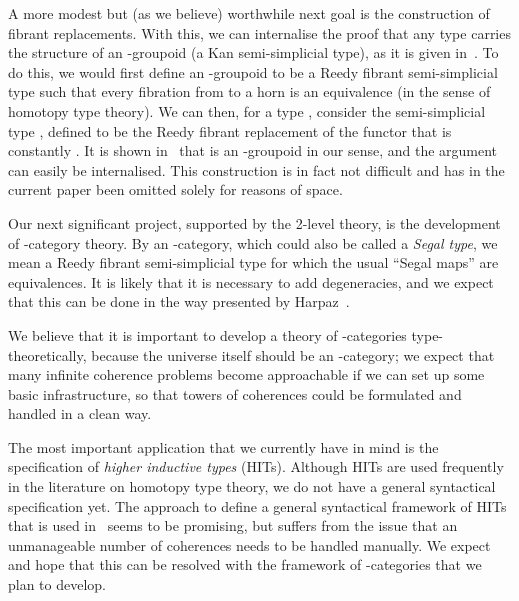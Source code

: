 \documentclass[a4paper,reqno]{amsart}
\theoremstyle{plain}
\theoremstyle{definition}
\begin{document}
A more modest but (as we believe) worthwhile next goal is the construction of fibrant replacements.
With this, we can internalise the proof that any type carries the structure of an -groupoid (a Kan semi-simplicial type), as it is given in~\cite[Remark and Corollary 16]{kraus_generaluniversalproperty}.
To do this, we would first define an -groupoid to be a Reedy fibrant semi-simplicial type  such that every fibration from  to a horn is an equivalence (in the sense of homotopy type theory).
We can then, for a type , consider the semi-simplicial type , defined to be the Reedy fibrant replacement of the functor that is constantly .
It is shown in~\cite{kraus_generaluniversalproperty} that  is an -groupoid in our sense, and the argument can easily be internalised. 
This construction is in fact not difficult and has in the current paper been omitted solely for reasons of space.

Our next significant project, supported by the 2-level theory, 
is the development of -category theory.
By an -category, which could also be called a \emph{Segal type}, we mean a Reedy fibrant semi-simplicial type  for which the usual ``Segal maps''  are equivalences.
It is likely that it is necessary to add degeneracies, and we expect that this can be done in the way presented by Harpaz~\cite{harpaz2015quasi}.

We believe that it is important to develop a theory of -categories
type-theoretically, because the universe itself should be an
-category; we expect that many infinite coherence problems become
approachable if we can set up some basic infrastructure, so that towers of
coherences could be formulated and handled in a clean way.

The most important application that we currently have in mind is the specification of \emph{higher inductive types} (HITs).
Although HITs are used frequently in the literature on homotopy type theory, we do not have a general syntactical specification yet.
The approach to define a general syntactical framework of HITs that is used in~\cite{gabe_HITs} seems to be promising, 
but suffers from the issue that an unmanageable number of coherences
needs to be handled manually.
We expect and hope that this can be resolved with the framework of -categories that we plan to develop.



\end{document}
